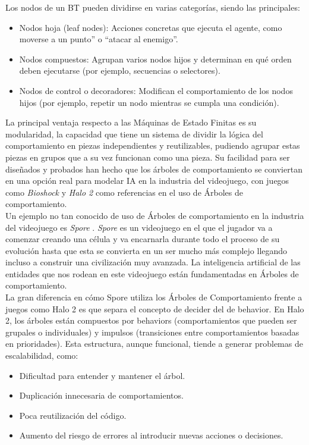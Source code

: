 Los nodos de un BT pueden dividirse en varias categorías, siendo las principales:

\begin{itemize}
\item Nodos hoja (leaf nodes): Acciones concretas que ejecuta el agente, como moverse a un punto'' o ``atacar al enemigo''.
\item Nodos compuestos: Agrupan varios nodos hijos y determinan en qué orden deben ejecutarse (por ejemplo, secuencias o selectores).
\item Nodos de control o decoradores: Modifican el comportamiento de los nodos hijos (por ejemplo, repetir un nodo mientras se cumpla una condición).
\end{itemize}

La principal ventaja respecto a las Máquinas de Estado Finitas es su modularidad, la capacidad que tiene un sistema de dividir la lógica del comportamiento en piezas independientes y reutilizables, pudiendo agrupar estas piezas en grupos que a su vez funcionan como una pieza. Su facilidad para ser diseñados y probados han hecho que los árboles de comportamiento se conviertan en una opción real para modelar IA en la industria del videojuego, con juegos como \textit{Bioshock} \citep{bioshock} y \textit{Halo 2} \citep{halo2} como referencias en el uso de Árboles de comportamiento.\\

Un ejemplo no tan conocido de uso de Árboles de comportamiento en la industria del videojuego es \textit{Spore} \citep{spore}. \textit{Spore} es un videojuego en el que el jugador va a comenzar creando una célula y va encarnarla durante todo el proceso de su evolución hasta que esta se convierta en un ser mucho más complejo llegando incluso a construir una civilización muy avanzada. La inteligencia artificial de las entidades que nos rodean en este videojuego están fundamentadas en Árboles de comportamiento.\\

La gran diferencia en cómo Spore utiliza los Árboles de Comportamiento frente a juegos como Halo 2 es que separa el concepto de decider del de behavior. En Halo 2, los árboles están compuestos por behaviors (comportamientos que pueden ser grupales o individuales) y impulsos (transiciones entre comportamientos basadas en prioridades). Esta estructura, aunque funcional, tiende a generar problemas de escalabilidad, como:
\begin{itemize}
	\item Dificultad para entender y mantener el árbol.
	\item Duplicación innecesaria de comportamientos.
	\item Poca reutilización del código.
	\item Aumento del riesgo de errores al introducir nuevas acciones o decisiones.
\end{itemize}


